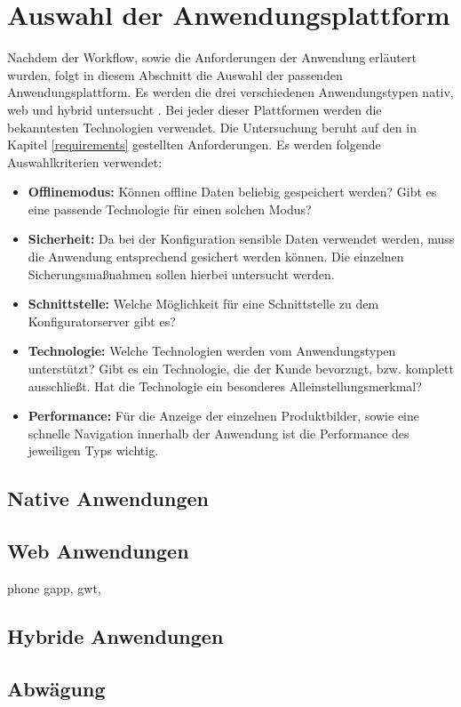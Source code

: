 \section{Auswahl der Anwendungsplattform}
Nachdem der Workflow, sowie die Anforderungen der Anwendung erläutert wurden, folgt in diesem Abschnitt die Auswahl der passenden Anwendungsplattform. Es werden die drei verschiedenen Anwendungstypen nativ, web und hybrid untersucht \cite{bib:mobilePlattform}. Bei jeder dieser Plattformen werden die bekanntesten Technologien verwendet. Die Untersuchung beruht auf den in Kapitel \ref{requirements} gestellten Anforderungen. Es werden folgende Auswahlkriterien verwendet:
\begin{itemize}
        \item \textbf{Offlinemodus:} Können offline Daten beliebig gespeichert werden? Gibt es eine passende Technologie für einen solchen Modus?
        
        \item \textbf{Sicherheit:} Da bei der Konfiguration sensible Daten verwendet werden, muss die Anwendung entsprechend gesichert werden können. Die einzelnen Sicherungsmaßnahmen sollen hierbei untersucht werden.
        
        \item \textbf{Schnittstelle:} Welche Möglichkeit für eine Schnittstelle zu dem Konfiguratorserver gibt es? 
        
        \item \textbf{Technologie:} Welche Technologien werden vom Anwendungstypen unterstützt? Gibt es ein Technologie, die der Kunde bevorzugt, bzw. komplett ausschließt. Hat die Technologie ein besonderes Alleinstellungsmerkmal?
        
        \item \textbf{Performance:} Für die Anzeige der einzelnen Produktbilder, sowie eine schnelle Navigation innerhalb der Anwendung ist die Performance des jeweiligen Typs wichtig.      
\end{itemize}



\subsection{Native Anwendungen}
\subsection{Web Anwendungen}
phone gapp, gwt, 
\subsection{Hybride Anwendungen}
\subsection{Abwägung}
